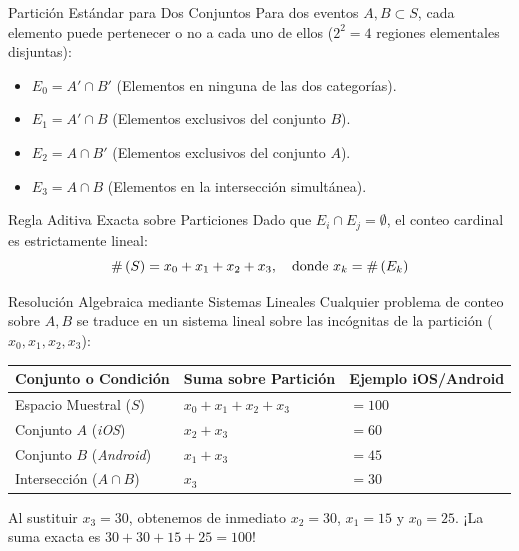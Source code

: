 \documentclass[10pt,aspectratio=169]{beamer}
\begin{document}
\begin{frame}{Partición Estándar para Dos Conjuntos}
  Para dos eventos $A, B \subset S$, cada elemento puede pertenecer o no a cada uno de ellos ($2^2 = 4$ regiones elementales disjuntas):
  
  \vspace{0.3em}
  \begin{itemize}
    \item $E_0 = A' \cap B'$ \quad (Elementos en ninguna de las dos categorías). \pause
    \item $E_1 = A' \cap B$ \quad (Elementos exclusivos del conjunto $B$). \pause
    \item $E_2 = A \cap B'$ \quad (Elementos exclusivos del conjunto $A$). \pause
    \item $E_3 = A \cap B$ \quad (Elementos en la intersección simultánea).
  \end{itemize}
  
  \vspace{0.3em}
  \pause
  \begin{block}{Regla Aditiva Exacta sobre Particiones}
    Dado que $E_i \cap E_j = \emptyset$, el conteo cardinal es estrictamente lineal:
    \[ \#\left( S \right) = x_0 + x_1 + x_2 + x_3, \quad \text{donde } x_k = \#\left( E_k \right) \]
  \end{block}
\end{frame}

\begin{frame}{Resolución Algebraica mediante Sistemas Lineales}
  Cualquier problema de conteo sobre $A, B$ se traduce en un sistema lineal sobre las incógnitas de la partición ($x_0, x_1, x_2, x_3$):
  
  \vspace{0.3em}
  \begin{center}
    \begin{tabular}{l l l}
      \textbf{Conjunto o Condición} & \textbf{Suma sobre Partición} & \textbf{Ejemplo iOS/Android} \\
      \hline
      Espacio Muestral ($S$) & $x_0 + x_1 + x_2 + x_3$ & $= 100$ \\
      Conjunto $A$ (\emph{iOS}) & $x_2 + x_3$ & $= 60$ \\
      Conjunto $B$ (\emph{Android}) & $x_1 + x_3$ & $= 45$ \\
      Intersección ($A \cap B$) & $x_3$ & $= 30$ \\
      \hline
    \end{tabular}
  \end{center}
  
  \vspace{0.3em}
  \pause
  Al sustituir $x_3 = 30$, obtenemos de inmediato $x_2 = 30$, $x_1 = 15$ y $x_0 = 25$. ¡La suma exacta es $30 + 30 + 15 + 25 = 100$!
\end{frame}
\end{document}
